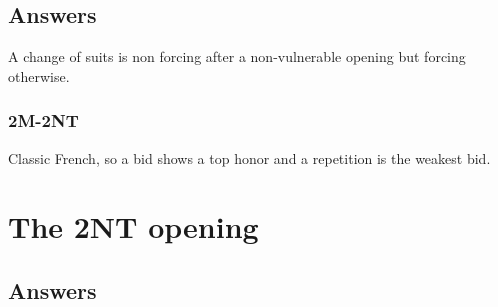 \documentclass[a4paper]{article}
\begin{document}
\subsection{Answers}

A change of suits is non forcing after a non-vulnerable opening but forcing otherwise.
\bigbreak
\subsubsection{2M-2NT}

Classic French, so a bid shows a top honor and a repetition is the weakest bid.
\bigbreak
\section{The 2NT opening}

\subsection{Answers}
\end{document}
